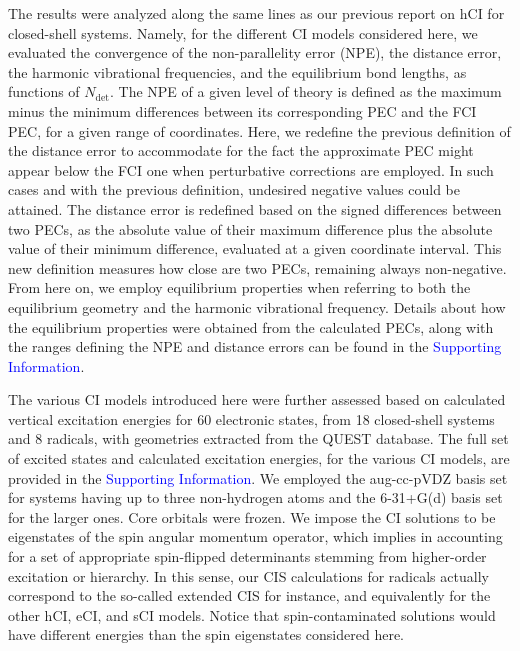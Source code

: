 \documentclass[aip,jcp,reprint,noshowkeys,superscriptaddress]{revtex4-1}
\newcommand{\SupInf}{\textcolor{blue}{Supporting Information}}
\newcommand{\Ndet}{N_\text{det}}
\begin{document}
The results were analyzed along the same lines as our previous report on hCI for closed-shell systems. \cite{Kossoski_2022}
Namely, for the different CI models considered here,
we evaluated the convergence of the non-parallelity error (NPE), the distance error, the harmonic vibrational frequencies, and the equilibrium bond lengths, as functions of $\Ndet$.
The NPE of a given level of theory is defined as the maximum minus the minimum differences between its corresponding PEC and the FCI PEC, for a given range of coordinates.
Here, we redefine the previous definition of the distance error \cite{Kossoski_2022} to accommodate for the fact the approximate PEC might appear below the FCI one when perturbative corrections are employed.
In such cases and with the previous definition, undesired negative values could be attained.
The distance error is redefined based on the signed differences between two PECs, as the absolute value of their maximum difference plus the absolute value of their minimum difference,
evaluated at a given coordinate interval.
This new definition measures how close are two PECs, remaining always non-negative.
From here on, we employ equilibrium properties when referring to both the equilibrium geometry and the harmonic vibrational frequency.
Details about how the equilibrium properties were obtained from the calculated PECs,
along with the ranges defining the NPE and distance errors can be found in the \SupInf.

The various CI models introduced here were further assessed based on calculated vertical excitation energies for 60 electronic states,
from 18 closed-shell systems and 8 radicals, with geometries extracted from the QUEST database. \cite{Veril_2021}
The full set of excited states and calculated excitation energies, for the various CI models, are provided in the {\SupInf}.
We employed the aug-cc-pVDZ basis set for systems having up to three non-hydrogen atoms and the 6-31+G(d) basis set for the larger ones.
Core orbitals were frozen.
We impose the CI solutions to be eigenstates of the spin angular momentum operator, which implies in accounting for a set of appropriate spin-flipped determinants stemming from higher-order excitation or hierarchy.
In this sense, our CIS calculations for radicals actually correspond to the so-called extended CIS \cite{Maurice_1996} for instance, and equivalently for the other hCI, eCI, and sCI models.
Notice that spin-contaminated solutions would have different energies than the spin eigenstates considered here.
\end{document}
